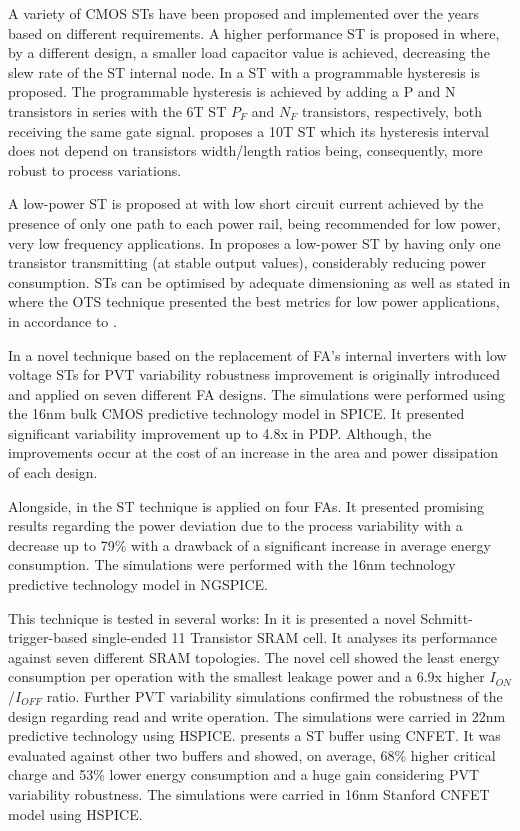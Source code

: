 \documentclass[pgmicro,mestrado,english]{iiufrgs}
\begin{document}
 A variety of CMOS STs have been proposed and implemented over the years based on different requirements. A higher performance ST is proposed in \cite{steyaert1986novel} where, by a different design, a smaller load capacitor value is achieved, decreasing the slew rate of the ST internal node. In \cite{pfister1992novel} a ST with a programmable hysteresis is proposed. The programmable hysteresis is achieved by adding a P and N transistors in series with the 6T ST $P_F$ and $N_F$ transistors, respectively, both receiving the same gate signal. \cite{kim1993new} proposes a 10T ST which its hysteresis interval does not depend on transistors width/length ratios being, consequently, more robust to process variations.

 A low-power ST is proposed at \cite{al2002low} with low short circuit current achieved by the presence of only one path to each power rail, being recommended for low power, very low frequency applications. In \cite{pedroni2005low} proposes a low-power ST by having only one transistor transmitting (at stable output values), considerably reducing power consumption. STs can be optimised by adequate dimensioning as well as stated in \cite{tache2018reliability} where the OTS technique presented the best metrics for low power applications, in accordance to \cite{zimpeck2016finfet}.

In \cite{dokania2015circuit} a novel technique based on the replacement of FA’s internal inverters with low voltage STs for PVT variability robustness improvement is originally introduced and applied on seven different FA designs. The simulations were performed using the 16nm bulk CMOS predictive technology model in SPICE. It presented significant variability improvement up to 4.8x in PDP. Although, the improvements occur at the cost of an increase in the area and power dissipation of each design.

Alongside, in \cite{samuel2016} the ST technique is applied on four FAs. It presented promising results regarding the power deviation due to the process variability with a decrease up to 79\% with a drawback of a significant increase in average energy consumption. The simulations were performed with the 16nm technology predictive technology model in NGSPICE.

This technique is tested in several works: In \cite{ahmad2016single} it is presented a novel Schmitt-trigger-based single-ended 11 Transistor SRAM cell. It analyses its performance against seven different SRAM topologies. The novel cell showed the least energy consumption per operation with the smallest leakage power and a 6.9x higher $I_{ON}$/$I_{OFF}$ ratio. Further PVT variability simulations confirmed the robustness of the design regarding read and write operation. The simulations were carried in 22nm predictive technology using HSPICE. \cite{moghaddam2017design} presents a ST buffer using CNFET. It was evaluated against other two buffers and showed, on average, 68\% higher critical charge and 53\% lower energy consumption and a huge gain considering PVT variability robustness. The simulations were carried in 16nm Stanford CNFET model using HSPICE.
\end{document}
